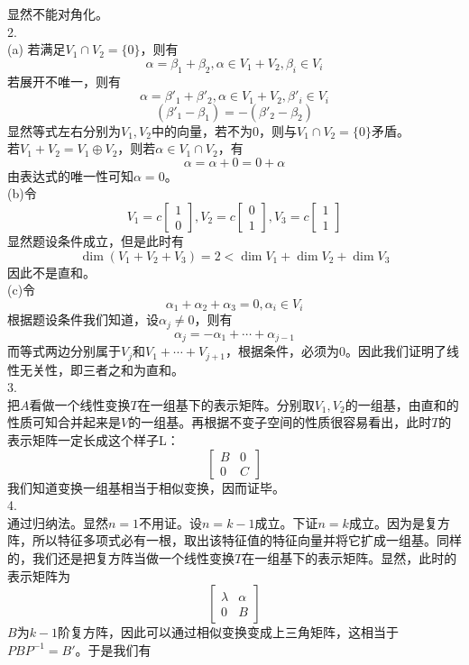 \documentclass[utf8]{ctexart}
\begin{document}
显然不能对角化。\\
2.\\
(a)
若满足$V_1\cap V_2=\{0\}$，则有
\[\alpha=\beta_1+\beta_2,\alpha\in V_1+V_2,\beta_i\in V_i\]
若展开不唯一，则有
\[\alpha=\beta'_1+\beta'_2,\alpha\in V_1+V_2,\beta'_i\in V_i\]
\[(\beta'_1-\beta_1)=-(\beta'_2-\beta_2)\]
显然等式左右分别为$V_1,V_2$中的向量，若不为$0$，则与$V_1\cap V_2=\{0\}$矛盾。\\
若$V_1+V_2=V_1\oplus V_2$，则若$\alpha\in V_1\cap V_2$，有
\[\alpha=\alpha+0=0+\alpha\]
由表达式的唯一性可知$\alpha=0$。\\
(b)令
\[V_1=c\begin{bmatrix}
	1\\
	0
\end{bmatrix},V_2=c\begin{bmatrix}
0\\
1
\end{bmatrix},V_3=c\begin{bmatrix}
1\\
1
\end{bmatrix}\]
显然题设条件成立，但是此时有
\[\dim(V_1+V_2+V_3)=2<\dim V_1+\dim V_2+\dim V_3\]
因此不是直和。\\
(c)令
\[\alpha_1+\alpha_2+\alpha_3=0,\alpha_i\in V_i\]
根据题设条件我们知道，设$\alpha_j\neq0$，则有
\[\alpha_j=-\alpha_1+\cdots+\alpha_{j-1}\]
而等式两边分别属于$V_j$和$V_1+\cdots+V_{j+1}$，根据条件，必须为$0$。因此我们证明了线性无关性，即三者之和为直和。\\
3.\\
把$A$看做一个线性变换$T$在一组基下的表示矩阵。分别取$V_1,V_2$的一组基，由直和的性质可知合并起来是$V$的一组基。再根据不变子空间的性质很容易看出，此时$T$的表示矩阵一定长成这个样子L：
\[\begin{bmatrix}
	B&0\\
	0&C
\end{bmatrix}\]
我们知道变换一组基相当于相似变换，因而证毕。\\
4.\\
通过归纳法。显然$n=1$不用证。设$n=k-1$成立。下证$n=k$成立。因为是复方阵，所以特征多项式必有一根，取出该特征值的特征向量并将它扩成一组基。同样的，我们还是把复方阵当做一个线性变换$T$在一组基下的表示矩阵。显然，此时的表示矩阵为
\[\begin{bmatrix}
	\lambda&\alpha\\
	0&B
\end{bmatrix}\]
$B$为$k-1$阶复方阵，因此可以通过相似变换变成上三角矩阵，这相当于$PBP^{-1}=B'$。于是我们有
\end{document}
